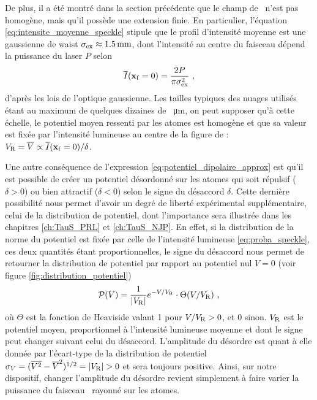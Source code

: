 De plus, il a été montré dans la section précédente que le champ de \speckle\ n'est pas homogène, mais qu'il possède une extension finie. En particulier, l'équation \ref{eq:intensite_moyenne_speckle} stipule que le profil d'intensité moyenne est une gaussienne de waist $\sigma_{\mathrm{ex}}\approx \SI{1.5}{\milli\metre}$, dont l'intensité au centre du faisceau dépend la puissance du laser $P$ selon
\begin{equation}
\overline{I}(\mathbf{x}_{\mathrm{f}}=0)=\frac{2P}{\pi \sigma_{\mathrm{ex}}^2} \text{ ,}
\end{equation}
d'après les lois de l'optique gaussienne. Les tailles typiques des nuages utilisés étant au maximum de quelques dizaines de \SI{}{\micro\metre}, on peut supposer qu'à cette échelle, le potentiel moyen ressenti par les atomes est homogène et que sa valeur est fixée par l'intensité lumineuse au centre de la figure de \speckle : $V_{\mathrm{R}}=\overline{V} \propto \overline{I}(\mathbf{x}_{\mathrm{f}}=0)/\delta$.

Une autre conséquence de l'expression \ref{eq:potentiel_dipolaire_approx} est qu'il est possible de créer un potentiel désordonné sur les atomes qui soit répulsif ($\delta>0$) ou bien attractif ($\delta<0$) selon le signe du désaccord $\delta$. Cette dernière possibilité nous permet d'avoir un degré de liberté expérimental supplémentaire, celui de la distribution de potentiel, dont l'importance sera illustrée dans les chapitres \ref{ch:TauS_PRL} et \ref{ch:TauS_NJP}. En effet, si la distribution de la norme du potentiel est fixée par celle de l'intensité lumineuse \ref{eq:proba_speckle}, ces deux quantités étant proportionnelles, le signe du désaccord nous permet de retourner la distribution de potentiel par rapport au potentiel nul $V=0$ (voir figure \ref{fig:distribution_potentiel})
\begin{equation}
\mathcal{P}(V)=\frac{1}{\left| V_{\mathrm{R}} \right|} e^{-V/V_{\mathrm{R}}} \cdot \Theta(V/V_{\mathrm{R}}) \text{ ,}
\label{eq:distribution_potentiel_speckle}
\end{equation}
où $\Theta$ est la fonction de Heaviside valant 1 pour $V/V_{\mathrm{R}}>0$, et 0 sinon. $V_{\mathrm{R}}$ est le potentiel moyen, proportionnel à l'intensité lumineuse moyenne et dont le signe peut changer suivant celui du désaccord. L'amplitude du désordre est quant à elle donnée par l'écart-type de la distribution de potentiel $ \sigma_{V}=(\overline{V^2}-\overline{V}^2)^{1/2}=\left|\VR\right|>0$ et sera toujours positive. Ainsi, sur notre dispositif, changer l'amplitude du désordre revient simplement à faire varier la puissance du faisceau \speckle\ rayonné sur les atomes.


